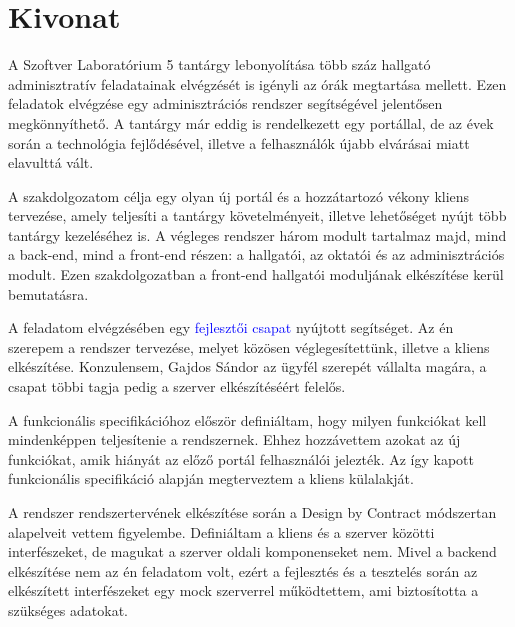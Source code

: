 \setcounter{page}{1}

\hungarianParagraph


\chapter*{Kivonat}

A Szoftver Laboratórium 5 tantárgy lebonyolítása több száz hallgató adminisztratív feladatainak elvégzését is igényli az órák megtartása mellett. Ezen feladatok elvégzése egy adminisztrációs rendszer segítségével jelentősen megkönnyíthető. A tantárgy már eddig is rendelkezett egy portállal, de az évek során a technológia fejlődésével, illetve a felhasználók újabb elvárásai miatt elavulttá vált. 

A szakdolgozatom célja egy olyan új portál és a hozzátartozó vékony kliens tervezése, amely teljesíti a tantárgy követelményeit, illetve lehetőséget nyújt több tantárgy kezeléséhez is. A végleges rendszer három modult tartalmaz majd, mind a back-end, mind a front-end részen: a hallgatói, az oktatói és az adminisztrációs modult. Ezen szakdolgozatban a front-end hallgatói moduljának elkészítése kerül bemutatásra.

A feladatom elvégzésében egy \textcolor{blue}{fejlesztői csapat} nyújtott segítséget. Az én szerepem a rendszer tervezése, melyet közösen véglegesítettünk, illetve a kliens elkészítése. Konzulensem, Gajdos Sándor az ügyfél szerepét vállalta magára, a csapat többi tagja pedig a szerver elkészítéséért felelős.

A funkcionális specifikációhoz először definiáltam, hogy milyen funkciókat kell mindenképpen teljesítenie a rendszernek. Ehhez hozzávettem azokat az új funkciókat, amik hiányát az előző portál felhasználói jelezték. Az így kapott funkcionális specifikáció alapján megterveztem a kliens külalakját.

A rendszer rendszertervének elkészítése során  a Design by Contract módszertan alapelveit vettem figyelembe. Definiáltam a kliens és a szerver közötti interfészeket, de magukat a szerver oldali komponenseket nem. Mivel a backend elkészítése nem az én feladatom volt, ezért a fejlesztés és a tesztelés során az elkészített interfészeket egy mock szerverrel működtettem, ami biztosította a szükséges adatokat. 

